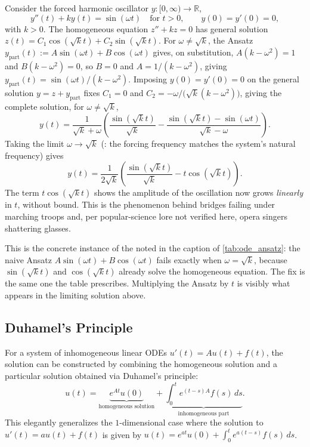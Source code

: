 \begin{example}
\label{ex:pure_resonance}
Consider the forced harmonic oscillator $y : [0,\infty) \to \mathbb{R}$,
\[y''(t) + ky(t) = \sin(\omega t) \quad \text{for } t>0, \qquad y(0)=y'(0)=0,\]
with $k>0$. The homogeneous equation $z''+kz=0$ has general solution
$z(t) = C_1\cos(\sqrt kt)+C_2\sin(\sqrt kt)$. For $\omega \neq \sqrt k$, the Ansatz
$y_{\mathrm{part}}(t) := A\sin(\omega t)+B\cos(\omega t)$ gives, on substitution,
$A(k-\omega^2)=1$ and $B(k-\omega^2)=0$, so $B=0$ and $A = 1/(k-\omega^2)$, giving
$y_{\mathrm{part}}(t) = \sin(\omega t)/(k-\omega^2)$. Imposing $y(0)=y'(0)=0$ on the general
solution $y=z+y_{\mathrm{part}}$ fixes $C_1=0$ and $C_2 = -\omega/\big(\sqrt k(k-\omega^2)\big)$,
giving the complete solution, for $\omega \neq \sqrt k$,
\[y(t) = \frac{1}{\sqrt k+\omega}\left(\frac{\sin(\sqrt kt)}{\sqrt k} -
  \frac{\sin(\sqrt kt)-\sin(\omega t)}{\sqrt k-\omega}\right).\]
Taking the limit $\omega \to \sqrt k$ (: the forcing frequency matches the
system's natural frequency) gives
\[y(t) = \frac{1}{2\sqrt k}\left(\frac{\sin(\sqrt kt)}{\sqrt k} - t\cos(\sqrt kt)\right).\]
The term $t\cos(\sqrt kt)$ shows the amplitude of the oscillation now grows \emph{linearly} in
$t$, without bound. This is the phenomenon behind bridges failing under marching troops and,
per popular-science lore not verified here, opera singers shattering glasses.
\end{example}

\begin{remark}
This is the concrete instance of the  noted in the caption of
\cref{tab:ode_ansatz}: the naive Ansatz $A\sin(\omega t)+B\cos(\omega t)$ fails exactly when
$\omega=\sqrt k$, because $\sin(\sqrt kt)$ and $\cos(\sqrt kt)$ already solve the homogeneous
equation. The fix is the same one the table prescribes. Multiplying the Ansatz by $t$ is
visibly what appears in the limiting solution above.
\end{remark}

\subsection{Duhamel's Principle}
\label{sec:duhamels_principle}

For a system of inhomogeneous linear ODEs $u'(t) = A u(t) + f(t)$, the solution can be constructed by combining the homogeneous solution and a particular solution obtained via Duhamel's principle:
\[u(t) = \underbrace{e^{At} u(0)}_{\text{homogeneous solution}} + \underbrace{\int_0^t e^{(t-s)A} f(s) \,ds}_{\text{inhomogeneous part}}.\]
This elegantly generalizes the $1$-dimensional case where the solution to $u'(t) = a u(t) + f(t)$ is given by $u(t) = e^{at} u(0) + \int_0^t e^{a(t-s)} f(s) \,ds$.


